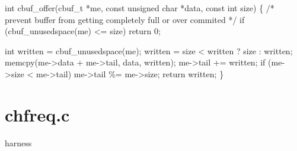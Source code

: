 \documentclass[
  a4paper,
]{scrreprt}
\newenvironment{Shaded}{\begin{snugshade}}{\end{snugshade}}
\newcommand{\CommentTok}[1]{\textcolor[rgb]{0.41,0.41,0.41}{#1}}
\newcommand{\ControlFlowTok}[1]{\textcolor[rgb]{0.85,0.12,0.09}{#1}}
\newcommand{\DataTypeTok}[1]{\textcolor[rgb]{0.47,0.16,0.63}{#1}}
\newcommand{\DecValTok}[1]{\textcolor[rgb]{0.47,0.16,0.63}{#1}}
\newcommand{\NormalTok}[1]{\textcolor[rgb]{0.33,0.33,0.33}{#1}}
\newcommand{\OperatorTok}[1]{\textcolor[rgb]{0.00,0.46,0.62}{#1}}
\theoremstyle{definition}
\theoremstyle{remark}
\begin{document}
\begin{Shaded}
\begin{Highlighting}[numbers=left,,]
\DataTypeTok{int}\NormalTok{ cbuf\_offer}\OperatorTok{(}\NormalTok{cbuf\_t }\OperatorTok{*}\NormalTok{me}\OperatorTok{,} \DataTypeTok{const} \DataTypeTok{unsigned} \DataTypeTok{char} \OperatorTok{*}\NormalTok{data}\OperatorTok{,} \DataTypeTok{const} \DataTypeTok{int}\NormalTok{ size}\OperatorTok{)}
\OperatorTok{\{}
    \CommentTok{/* prevent buffer from getting completely full or over commited */}
    \ControlFlowTok{if} \OperatorTok{(}\NormalTok{cbuf\_unusedspace}\OperatorTok{(}\NormalTok{me}\OperatorTok{)} \OperatorTok{\textless{}=}\NormalTok{ size}\OperatorTok{)}
        \ControlFlowTok{return} \DecValTok{0}\OperatorTok{;}

    \DataTypeTok{int}\NormalTok{ written }\OperatorTok{=}\NormalTok{ cbuf\_unusedspace}\OperatorTok{(}\NormalTok{me}\OperatorTok{);}
\NormalTok{    written }\OperatorTok{=}\NormalTok{ size }\OperatorTok{\textless{}}\NormalTok{ written }\OperatorTok{?}\NormalTok{ size }\OperatorTok{:}\NormalTok{ written}\OperatorTok{;}
\NormalTok{    memcpy}\OperatorTok{(}\NormalTok{me}\OperatorTok{{-}\textgreater{}}\NormalTok{data }\OperatorTok{+}\NormalTok{ me}\OperatorTok{{-}\textgreater{}}\NormalTok{tail}\OperatorTok{,}\NormalTok{ data}\OperatorTok{,}\NormalTok{ written}\OperatorTok{);}
\NormalTok{    me}\OperatorTok{{-}\textgreater{}}\NormalTok{tail }\OperatorTok{+=}\NormalTok{ written}\OperatorTok{;}
    \ControlFlowTok{if} \OperatorTok{(}\NormalTok{me}\OperatorTok{{-}\textgreater{}}\NormalTok{size }\OperatorTok{\textless{}}\NormalTok{ me}\OperatorTok{{-}\textgreater{}}\NormalTok{tail}\OperatorTok{)}
\NormalTok{        me}\OperatorTok{{-}\textgreater{}}\NormalTok{tail }\OperatorTok{\%=}\NormalTok{ me}\OperatorTok{{-}\textgreater{}}\NormalTok{size}\OperatorTok{;}
    \ControlFlowTok{return}\NormalTok{ written}\OperatorTok{;}
\OperatorTok{\}}
\end{Highlighting}
\end{Shaded}

\section{chfreq.c}\label{chfreq.c}

harness
\end{document}

